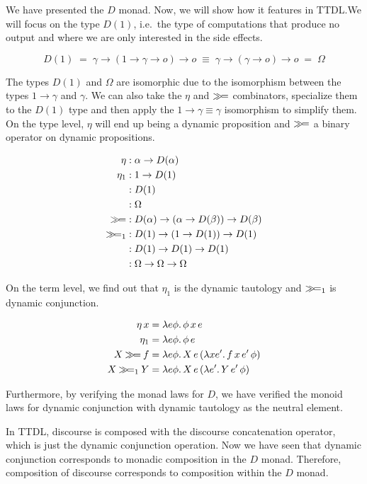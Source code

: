 We have presented the $D$ monad. Now, we will show how it features in
TTDL.\@ We will focus on the type $D(1)$, i.e.\ the type of computations
that produce no output and where we are only interested in the side
effects.

$$
D(1) \; = \; \gamma \to (1 \to \gamma \to o) \to o \; \equiv \;
\gamma \to (\gamma \to o) \to o \; = \; \Omega
$$

The types $D(1)$ and $\Omega$ are isomorphic due to the isomorphism between
the types $1 \to \gamma$ and $\gamma$. We can also take the $\eta$ and
$\mathbin{\gg\!=}$ combinators, specialize them to the $D(1)$ type and then apply
the $1 \to \gamma \equiv \gamma$ isomorphism to simplify them. On the type
level, $\eta$ will end up being a dynamic proposition and $\mathbin{\gg\!=}$ a
binary operator on dynamic propositions.

\begin{align*}
  \eta &: \alpha \to D(\alpha) \\
  \eta_1 &: 1 \to D(1) \\
         &: D(1) \\
         &: \Omega \\
  \mathbin{\gg\!=} &: D(\alpha) \to (\alpha \to D(\beta)) \to D(\beta) \\
  \mathbin{\gg\!=}_1 &: D(1) \to (1 \to D(1)) \to D(1) \\
            &: D(1) \to D(1) \to D(1) \\
            &: \Omega \to \Omega \to \Omega
\end{align*}

On the term level, we find out that $\eta_1$ is the dynamic tautology and
$\mathbin{\gg\!=}_1$ is dynamic conjunction.

\begin{align*}
  \eta\,x &= \lambda e \phi.\, \phi\,x\,e \\
  \eta_1 &= \lambda e \phi.\, \phi\,e \\
  X \mathbin{\gg\!=} f &= \lambda e \phi.\, X\,e\,(\lambda x e'.\, f\,x\,e'\,\phi) \\
  X \mathbin{\gg\!=}_1 Y &= \lambda e \phi.\, X\,e\,(\lambda e'.\, Y\,e'\,\phi)
\end{align*}

Furthermore, by verifying the monad laws for $D$, we have verified the
monoid laws for dynamic conjunction with dynamic tautology as the neutral
element.

In TTDL, discourse is composed with the discourse concatenation operator,
which is just the dynamic conjunction operation. Now we have seen that
dynamic conjunction corresponds to monadic composition in the $D$
monad. Therefore, composition of discourse corresponds to composition
within the $D$ monad.


